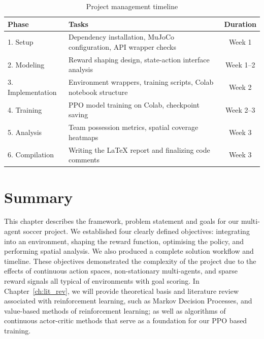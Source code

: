 \begin{table}[!ht]
    \centering
    \caption{Project management timeline}
    \label{tab:gantt}
    \begin{tabular}{llc}
        \toprule
        \textbf{Phase} & \textbf{Tasks} & \textbf{Duration} \\
        \midrule
        1. Setup         & Dependency installation, MuJoCo configuration, API wrapper checks & Week 1 \\
        2. Modeling      & Reward shaping design, state-action interface analysis & Week 1--2 \\
        3. Implementation & Environment wrappers, training scripts, Colab notebook structure & Week 2 \\
        4. Training      & PPO model training on Colab, checkpoint saving & Week 2--3 \\
        5. Analysis      & Team possession metrics, spatial coverage heatmaps & Week 3 \\
        6. Compilation   & Writing the LaTeX report and finalizing code comments & Week 3 \\
        \bottomrule
    \end{tabular}
\end{table}

\section{Summary}
\label{sec:intro_summary}

This chapter describes the framework, problem statement and goals for our multi-agent soccer 
project. We established four clearly defined objectives: integrating into an environment, 
shaping the reward function, optimising the policy, and performing spatial analysis. We also 
produced a complete solution workflow and timeline. These objectives demonstrated the complexity 
of the project due to the effects of continuous action spaces, non-stationary multi-agents, 
and sparse reward signals all typical of environments with goal scoring. In Chapter~\ref{ch:lit_rev}, 
we will provide theoretical basis and literature review associated with reinforcement learning, 
such as Markov Decision Processes, and value-based methods of reinforcement learning; as well 
as algorithms of continuous actor-critic methods that serve as a foundation for our PPO based 
training.